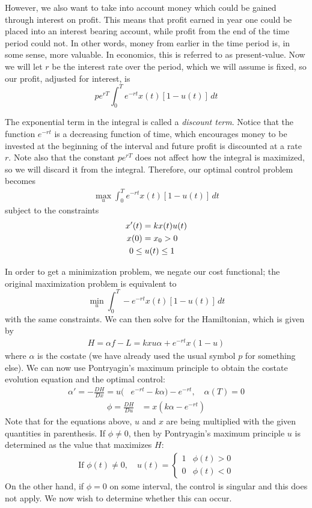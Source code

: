 However, we also want to take into account money which could be gained through interest on profit. This means that profit earned in year one could be placed into an interest bearing account, while profit from the end of the time period could not. In other words, money from earlier in the time period is, in some sense, more valuable. In economics, this is referred to as present-value. Now we will let $r$ be the interest rate over the period, which we will assume is fixed, so our profit, adjusted for interest, is
\[pe^{rT} \int_0^T  e^{-rt} x(t)[1-u(t)] \, dt\]

The exponential term in the integral is called a \textit{discount term}. 
Notice that the function $e^{-rt}$ is a decreasing function of time, which encourages money to be invested at the beginning of the interval and future profit is discounted at a rate $r$. 
Note also that the constant $pe^{rT}$ does not affect how the integral is maximized, so we will discard it from the integral.
Therefore, our optimal control problem becomes
\begin{align}
\max_{u} \int_0^T  e^{-rt} x(t)[1-u(t)] \, dt
\end{align}
subject to the constraints
\begin{align}
    \label{eq:timberharvest:x}
    x'(t) &= kx(t)u(t) \\
    x(0) &= x_{0} > 0 \notag \\
    0 \leq&\; u(t) \leq 1 \notag
\end{align}
    
In order to get a minimization problem, we negate our cost functional; the original maximization problem is equivalent to 
\[
\min_{u} \int_0^T  -e^{-rt} x(t)[1-u(t)] \, dt
\]
with the same constraints.
We can then solve for the Hamiltonian, which is given by
\begin{align*}
H = \alpha f - L = kxu\alpha+e^{-rt}x(1-u)
\end{align*}
where \(\alpha\) is the costate (we have already used the usual symbol \(p\) for something else).
We can now use Pontryagin's maximum principle to obtain the costate evolution equation and the optimal control:
\begin{align}
\label{eq:timber:costate}
\alpha ' = -\frac{DH}{Dx}=u(&e^{-rt} - k\alpha) - e^{-rt}, \quad \alpha(T)=0
\end{align}
\begin{align}
\label{eq:timber:phi}
\phi = \frac{D H}{D u} &= x(k\alpha - e^{-rt})
\end{align}
Note that for the equations above, $u$ and $x$ are being multiplied with the given quantities in parenthesis.
If \(\phi\neq 0\), then by Pontryagin's maximum principle \(u\) is determined as the value that maximizes \(H\):
\begin{align}
\label{eq:timber:get_u_from_phi}
\text{If }\phi(t)\neq 0,\quad u(t)=\begin{cases} 1& \phi(t)>0 \\ 0 & \phi(t) < 0\end{cases}
\end{align}
On the other hand, if \(\phi=0\) on some interval, the control is singular and this does not apply.
We now wish to determine whether this can occur. 

